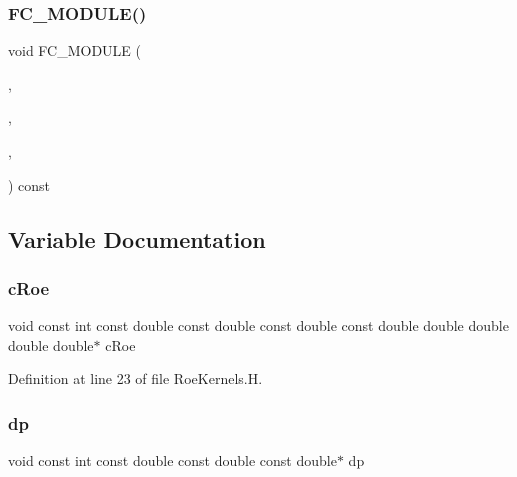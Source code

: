 \hypertarget{RoeKernels_8H_a341cfd2959d425a676b8174cdedce055}{}\label{RoeKernels_8H_a341cfd2959d425a676b8174cdedce055} 
\subsubsection{\texorpdfstring{F\+C\+\_\+\+M\+O\+D\+U\+L\+E()}{FC\_MODULE()}\hspace{0.1cm}{\footnotesize\ttfamily [5/5]}}
{\footnotesize\ttfamily void F\+C\+\_\+\+M\+O\+D\+U\+LE (\begin{DoxyParamCaption}\item[{roe}]{,  }\item[{form\+\_\+roe\+\_\+matrices}]{,  }\item[{R\+OE}]{,  }\item[{F\+O\+R\+M\+\_\+\+R\+O\+E\+\_\+\+M\+A\+T\+R\+I\+C\+ES}]{ }\end{DoxyParamCaption}) const}



\subsection{Variable Documentation}
\hypertarget{RoeKernels_8H_a333c205cc8e2644d5201ac7099775c88}{}\label{RoeKernels_8H_a333c205cc8e2644d5201ac7099775c88} 
\subsubsection{\texorpdfstring{c\+Roe}{cRoe}}
{\footnotesize\ttfamily void const int const double const double const double const double double double double double$\ast$ c\+Roe}



Definition at line 23 of file Roe\+Kernels.\+H.

\hypertarget{RoeKernels_8H_ac12401cc24ddbf8b003a0e6201826e90}{}\label{RoeKernels_8H_ac12401cc24ddbf8b003a0e6201826e90} 
\subsubsection{\texorpdfstring{dp}{dp}}
{\footnotesize\ttfamily void const int const double const double const double$\ast$ dp}



